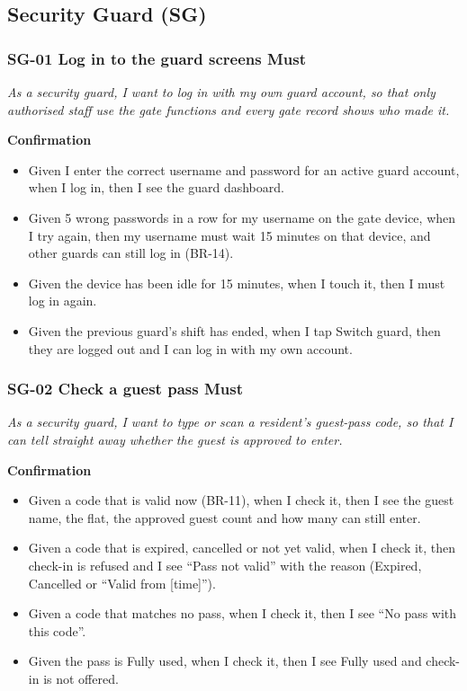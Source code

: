 \documentclass[11pt,a4paper]{report}
\begin{document}
\subsection{Security Guard (SG)}

\subsubsection*{SG-01 \textperiodcentered{} Log in to the guard screens \textperiodcentered{} Must}

\emph{As a security guard, I want to log in with my own guard account, so that only authorised staff use the gate functions and every gate record shows who made it.}

\medskip\noindent\textbf{Confirmation}\par

\begin{itemize}
  \item Given I enter the correct username and password for an active guard account, when I log in, then I see the guard dashboard.
  \item Given 5 wrong passwords in a row for my username on the gate device, when I try again, then my username must wait 15 minutes on that device, and other guards can still log in (BR-14).
  \item Given the device has been idle for 15 minutes, when I touch it, then I must log in again.
  \item Given the previous guard's shift has ended, when I tap Switch guard, then they are logged out and I can log in with my own account.
\end{itemize}

\subsubsection*{SG-02 \textperiodcentered{} Check a guest pass \textperiodcentered{} Must}

\emph{As a security guard, I want to type or scan a resident's guest-pass code, so that I can tell straight away whether the guest is approved to enter.}

\medskip\noindent\textbf{Confirmation}\par

\begin{itemize}
  \item Given a code that is valid now (BR-11), when I check it, then I see the guest name, the flat, the approved guest count and how many can still enter.
  \item Given a code that is expired, cancelled or not yet valid, when I check it, then check-in is refused and I see ``Pass not valid'' with the reason (Expired, Cancelled or ``Valid from [time]'').
  \item Given a code that matches no pass, when I check it, then I see ``No pass with this code''.
  \item Given the pass is Fully used, when I check it, then I see Fully used and check-in is not offered.
\end{itemize}
\end{document}
